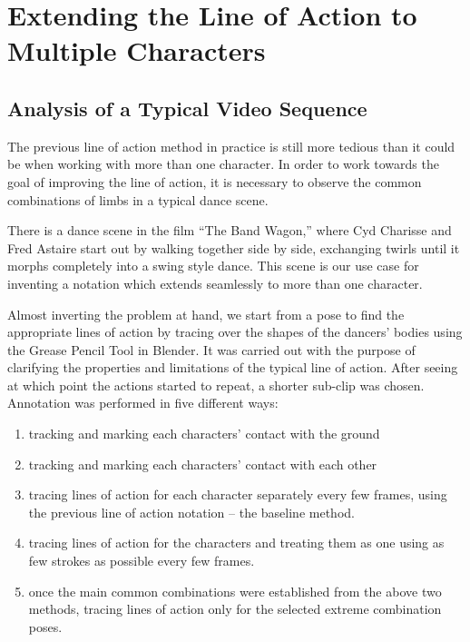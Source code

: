 \chapter{Extending the Line of Action to Multiple Characters}\label{chap:implementation}

\section{Analysis of a Typical Video Sequence}
The previous line of action method in practice is still more tedious than it could be when working with more than one character. In order to work towards the goal of improving the line of action, it is necessary to observe the common combinations of limbs in a typical dance scene.

There is a dance scene in the film ``The Band Wagon,'' where Cyd Charisse and Fred Astaire start out by walking together side by side, exchanging twirls until it morphs completely into a swing style dance. This scene is our use case for inventing a notation which extends seamlessly to more than one character.

Almost inverting the problem at hand, we start from a pose to find the appropriate lines of action by tracing over the shapes of the dancers' bodies using the Grease Pencil Tool in Blender. It was carried out with the purpose of clarifying the properties and limitations of the typical line of action. After seeing at which point the actions started to repeat, a shorter sub-clip was chosen. Annotation was performed in five different ways:
\begin{enumerate}
	\item tracking and marking each characters' contact with the ground
	\item tracking and marking each characters' contact with each other
	\item tracing lines of action for each character separately every few frames, using the previous line of action notation -- the baseline method.
	\item tracing lines of action for the characters and treating them as one using as few strokes as possible every few frames.
	\item once the main common combinations were established from the above two methods, tracing lines of action only for the selected extreme combination poses.
\end{enumerate}

